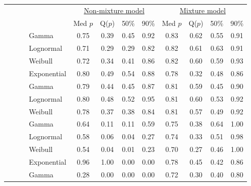 \documentclass[useAMS,usenatbib,referee,12pt]{article}
\begin{document}
\begin{table}[ht]
\end{table}



\begin{table}[ht]\centering\footnotesize
\begin{tabular}{l|l|l|l|cccc|cccc}
 \multicolumn{4}{c|}{ } & \multicolumn{4}{c|}{\underline{Non-mixture model}} & \multicolumn{4}{c}{\underline{Mixture model}} \\
 \multicolumn{4}{c|}{ } & Med $p$ & Q($p$) & 50\% & 90\% & Med $p$ & Q($p$) & 50\% & 90\% \\ 
  \hline
  \hline
 \parbox[t]{2mm}{} & \parbox[t]{2mm}{} & \parbox[t]{2mm}{} & Gamma & 0.75 & 0.39 & 0.45 & 0.92 & 0.83 & 0.62 & 0.55 & 0.91 \\ 
   &  &  & Lognormal & 0.71 & 0.29 & 0.29 & 0.82 & 0.82 & 0.61 & 0.63 & 0.91 \\ 
   &  &  & Weibull & 0.72 & 0.34 & 0.41 & 0.86 & 0.82 & 0.60 & 0.59 & 0.93 \\ 
    &  &  & Exponential & 0.80 & 0.49 & 0.54 & 0.88 & 0.78 & 0.32 & 0.48 & 0.86 \\ 
 & & \parbox[t]{2mm}{} & Gamma & 0.79 & 0.44 & 0.45 & 0.87 & 0.81 & 0.59 & 0.45 & 0.90 \\ 
   &  &  & Lognormal & 0.80 & 0.48 & 0.52 & 0.95 & 0.81 & 0.60 & 0.53 & 0.92 \\ 
   &  &  & Weibull & 0.78 & 0.37 & 0.38 & 0.84 & 0.81 & 0.57 & 0.49 & 0.92 \\ 
& \parbox[t]{2mm}{} & \parbox[t]{2mm}{} & Gamma & 0.64 & 0.11 & 0.11 & 0.59 & 0.75 & 0.38 & 0.64 & 1.00 \\ 
   &  &  & Lognormal & 0.58 & 0.06 & 0.04 & 0.27 & 0.74 & 0.33 & 0.51 & 0.98 \\ 
   &  &  & Weibull & 0.54 & 0.04 & 0.01 & 0.23 & 0.70 & 0.27 & 0.46 & 1.00 \\ 
   &  &  & Exponential & 0.96 & 1.00 & 0.00 & 0.00 & 0.78 & 0.45 & 0.42 & 0.86 \\ 
 & & \parbox[t]{2mm}{} & Gamma & 0.28 & 0.00 & 0.00 & 0.00 & 0.72 & 0.30 & 0.40 & 0.80 \\ 

\end{tabular}
\end{table}
\end{document}
